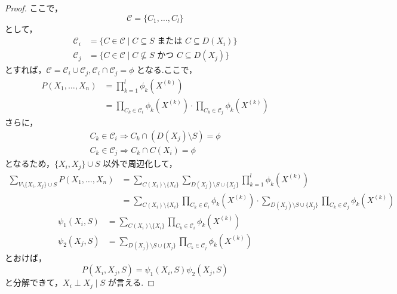 \documentclass[uplatex, dvipdfmx]{jsarticle}
\begin{document}
\begin{proof}
  ここで，
  \begin{equation*}
      \mathscr{C} = \{C_1, \dots, C_l\}
  \end{equation*}
  として，
  \begin{align*}
      \mathscr{C}_i &= \{ C \in \mathscr{C} \mid C \subseteq S \text{ または } C \subseteq D(X_i) \} \\
      \mathscr{C}_j &= \{ C \in \mathscr{C} \mid C \not\subseteq S \text{ かつ } C \subseteq D(X_j) \}
  \end{align*}
  とすれば，$\mathscr{C} = \mathscr{C}_i \cup \mathscr{C}_j, \mathscr{C}_i \cap \mathscr{C}_j = \phi$ となる.ここで，
  \begin{align*}
      P(X_1, \dots, X_n) &= \prod_{k=1}^{l} \phi_k(X^{(k)}) \\
      &= \prod_{C_k \in \mathscr{C}_i} \phi_k(X^{(k)}) \cdot \prod_{C_k \in \mathscr{C}_j} \phi_k(X^{(k)})
  \end{align*}
  さらに，
  \begin{align}
    C_k \in \mathscr{C}_i \Rightarrow C_k \cap (D(X_j) \setminus S) = \phi \\
    C_k \in \mathscr{C}_j \Rightarrow C_k \cap C(X_i) = \phi
  \end{align}     
  となるため，$\{X_i, X_j\} \cup S$ 以外で周辺化して，
  \begin{align*}
      \sum_{V \setminus \{X_i, X_j\} \cup S} P(X_1, \dots, X_n) &= \sum_{C(X_i) \setminus \{X_i\}} \sum_{D(X_j) \setminus S \cup \{X_j\}} \prod_{k=1}^l \phi_k(X^{(k)}) \\
      &= \sum_{C(X_i) \setminus \{X_i\}} \prod_{C_k \in \mathscr{C}_i} \phi_k(X^{(k)}) \cdot \sum_{D(X_j) \setminus S \cup \{X_j\}} \prod_{C_k \in \mathscr{C}_j} \phi_k(X^{(k)})
  \end{align*}
  \begin{align*}
      \psi_1(X_i, S) &= \sum_{C(X_i) \setminus \{X_i\}} \prod_{C_k \in \mathscr{C}_i} \phi_k(X^{(k)}) \\
      \psi_2(X_j, S) &= \sum_{D(X_j) \setminus S \cup \{X_j\}} \prod_{C_k \in \mathscr{C}_j} \phi_k(X^{(k)})
  \end{align*}
  とおけば，
  \begin{equation*}
      P(X_i, X_j, S) = \psi_1(X_i, S) \psi_2(X_j, S)
  \end{equation*}
  と分解できて，$X_i \perp X_j \mid S$ が言える.
\end{proof}
\end{document}
